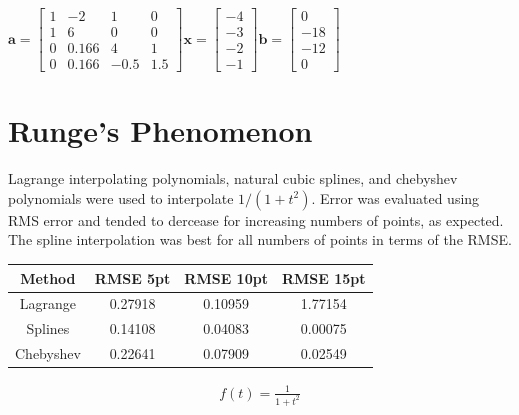 \documentclass[12pt]{article}
\begin{document}
  $
  \bm{a} = \left[
  \begin{matrix}
  1 & -2 & 1 & 0 \\
  1 & 6 & 0 & 0 \\
  0 & 0.166 & 4 & 1 \\
  0 & 0.166 & -0.5 & 1.5
  \end{matrix}
  \right]
  \bm{x} = \left[
  \begin{matrix}
  -4     \\
  -3        \\
  -2     \\
  -1
  \end{matrix}
  \right]
  \bm{b} = \left[
  \begin{matrix}
  0   \\
  -18 \\
  -12 \\
  0
  \end{matrix}
  \right]
  $


  \section{Runge's Phenomenon}

  Lagrange interpolating polynomials, natural cubic splines, and chebyshev
  polynomials were used to interpolate $1/(1+t^2)$. Error was evaluated using
  RMS error and tended to dercease for increasing numbers of points, as expected.
  The spline interpolation was best for all numbers of points in terms of the
  RMSE.

  \begin{table}[h!]
  \centering
  \begin{tabular}{| c | c | c | c |}
    \hline
    Method    & RMSE 5pt & RMSE 10pt & RMSE 15pt \\ \hline
    Lagrange  & 0.27918  & 0.10959   & 1.77154   \\
    Splines   & 0.14108  & 0.04083   & 0.00075   \\
    Chebyshev & 0.22641  & 0.07909   & 0.02549   \\ \hline
  \end{tabular}
  \end{table}


  \begin{align}
    f(t)=\frac{1}{1+t^2}
  \end{align}
\end{document}
